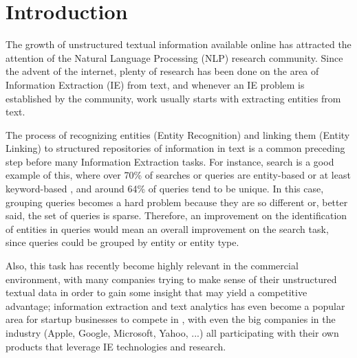 \section{Introduction}
The growth of unstructured textual information available online has attracted the attention of the Natural Language Processing (NLP) research community.
Since the advent of the internet, plenty of research has been done on the area of Information Extraction (IE) from text,
and whenever an IE problem is established by the community, work usually starts with extracting entities from text.

The process of recognizing entities (Entity Recognition) and linking them (Entity Linking) to structured repositories of information in text
is a common preceding step before many Information Extraction tasks.
For instance, search is a good example of this, where over 70\% of searches or queries are entity-based or at least keyword-based \cite{webpatterns},
and around 64\% of queries tend to be unique.
In this case, grouping queries becomes a hard problem because they are so different or, better said, the set of queries is sparse.
Therefore, an improvement on the identification of entities in queries would mean an overall improvement on the search task,
since queries could be grouped by entity or entity type.

Also, this task has recently become highly relevant in the commercial environment, with many companies trying to make sense of their unstructured textual data
in order to gain some insight that may yield a competitive advantage;
information extraction and text analytics has even become a popular area for startup businesses to compete in \cite{techcrunch, ventureradar},
with even the big companies in the industry (Apple, Google, Microsoft, Yahoo, ...) all participating with their own products that leverage IE technologies and research.

